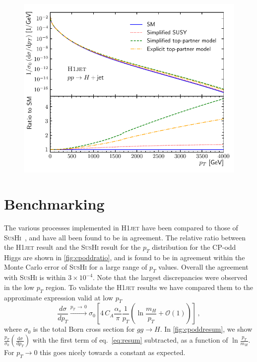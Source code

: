 \documentclass[12pt]{article}
\begin{document}
\begin{figure}[tbh]
\begin{minipage}{.485\textwidth}
  \includegraphics[width=\linewidth]{figures/MoneyPlot.pdf}
  \label{fig:moneyplot}
\end{minipage}
\end{figure}

\vspace{-3mm} 

\section{Benchmarking}
\label{sec:benchmarking}
The various processes implemented in \textsc{H1jet} have been compared to those of \textsc{SusHi}~\cite{Harlander:2012pb,Harlander:2016hcx}, and have all been found to be in agreement. The relative ratio between the \textsc{H1jet} result and the
\textsc{SusHi} result for the $p_T$ distribution for the CP-odd Higgs
are shown in \autoref{fig:cpoddratio}, and is found to be in agreement
within the Monte Carlo error of \textsc{SusHi} for a large range of
$p_T$ values. Overall the agreement with \textsc{SusHi} is within
$3 \times 10^{-4}$. Note that the largest discrepancies were observed in the low $p_T$
region. To validate the \textsc{H1jet} results we have compared them
to the approximate expression valid at low $p_T$
\begin{equation}
	\frac{d \sigma}{d p_T} \xrightarrow{p_T \, \rightarrow \, 0} \sigma_0 \left [ 4 \, C_A \frac{\alpha_s}{\pi} \frac{1}{p_T} \left(\ln \frac{m_H}{p_T} + \mathcal{O} (1)\right) \right ] \,, \label{eq:resum}
\end{equation}
where $\sigma_0$ is the total Born cross section for $gg \rightarrow H$. In \autoref{fig:cpoddresum}, we show $\frac{p_T}{\sigma_0} \left ( \frac{\mathrm{d} \sigma}{\mathrm{d} p_T} \right )$ with the first term of eq.~\eqref{eq:resum} subtracted, as a function of $\ln \frac{p_T}{m_H}$. For $p_T \rightarrow 0$ this goes nicely towards a constant as expected. 
\end{document}
